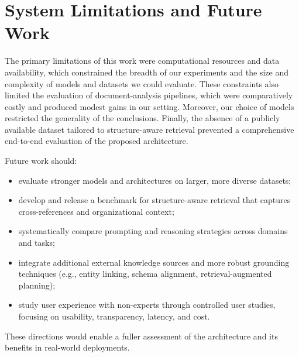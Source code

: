 \section{System Limitations and Future Work}
The primary limitations of this work were computational resources and data availability, which constrained the breadth of our experiments and the size and complexity of models and datasets we could evaluate. These constraints also limited the evaluation of document-analysis pipelines, which were comparatively costly and produced modest gains in our setting. Moreover, our choice of models restricted the generality of the conclusions. Finally, the absence of a publicly available dataset tailored to structure-aware retrieval prevented a comprehensive end-to-end evaluation of the proposed architecture.

Future work should:
\begin{itemize}
	\item evaluate stronger models and architectures on larger, more diverse datasets;
	\item develop and release a benchmark for structure-aware retrieval that captures cross-references and organizational context;
	\item systematically compare prompting and reasoning strategies across domains and tasks;
	\item integrate additional external knowledge sources and more robust grounding techniques (e.g., entity linking, schema alignment, retrieval-augmented planning);
	\item study user experience with non-experts through controlled user studies, focusing on usability, transparency, latency, and cost.
\end{itemize}

These directions would enable a fuller assessment of the architecture and its benefits in real-world deployments.




